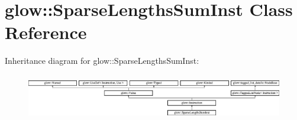 \hypertarget{classglow_1_1_sparse_lengths_sum_inst}{}\section{glow\+:\+:Sparse\+Lengths\+Sum\+Inst Class Reference}
\label{classglow_1_1_sparse_lengths_sum_inst}
Inheritance diagram for glow\+:\+:Sparse\+Lengths\+Sum\+Inst\+:\begin{figure}[H]
\begin{center}
\leavevmode
\includegraphics[height=1.991111cm]{classglow_1_1_sparse_lengths_sum_inst}
\end{center}
\end{figure}
